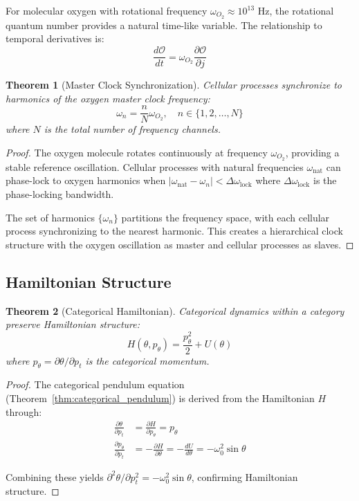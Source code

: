 \documentclass[11pt,twocolumn,a4paper]{article}
\newtheorem{theorem}{Theorem}[section]
\theoremstyle{definition}
\theoremstyle{remark}
\newcommand{\omegalock}{\Delta\omega_{\mathrm{lock}}}
\begin{document}
For molecular oxygen with rotational frequency $\omega_{O_2} \approx 10^{13}$ Hz, the rotational quantum number provides a natural time-like variable. The relationship to temporal derivatives is:
\begin{equation}
\frac{d\mathcal{O}}{dt} = \omega_{O_2} \frac{\partial \mathcal{O}}{\partial j}
\label{eq:gyrometric_temporal}
\end{equation}

\begin{theorem}[Master Clock Synchronization]
\label{thm:master_clock}
Cellular processes synchronize to harmonics of the oxygen master clock frequency:
\begin{equation}
\omega_n = \frac{n}{N} \omega_{O_2}, \quad n \in \{1,2,\ldots,N\}
\label{eq:master_clock_harmonics}
\end{equation}
where $N$ is the total number of frequency channels.
\end{theorem}

\begin{proof}
The oxygen molecule rotates continuously at frequency $\omega_{O_2}$, providing a stable reference oscillation. Cellular processes with natural frequencies $\omega_{\mathrm{nat}}$ can phase-lock to oxygen harmonics when $|\omega_{\mathrm{nat}} - \omega_n| < \omegalock$ where $\omegalock$ is the phase-locking bandwidth.

The set of harmonics $\{\omega_n\}$ partitions the frequency space, with each cellular process synchronizing to the nearest harmonic. This creates a hierarchical clock structure with the oxygen oscillation as master and cellular processes as slaves.
\end{proof}

\subsection{Hamiltonian Structure}

\begin{theorem}[Categorical Hamiltonian]
\label{thm:categorical_hamiltonian}
Categorical dynamics within a category preserve Hamiltonian structure:
\begin{equation}
H(\theta, p_\theta) = \frac{p_\theta^2}{2} + U(\theta)
\label{eq:categorical_hamiltonian}
\end{equation}
where $p_\theta = \partial\theta/\partial p_t$ is the categorical momentum.
\end{theorem}

\begin{proof}
The categorical pendulum equation (Theorem~\ref{thm:categorical_pendulum}) is derived from the Hamiltonian $H$ through:
\begin{align}
\frac{\partial\theta}{\partial p_t} &= \frac{\partial H}{\partial p_\theta} = p_\theta \label{eq:hamilton_1} \\
\frac{\partial p_\theta}{\partial p_t} &= -\frac{\partial H}{\partial \theta} = -\frac{dU}{d\theta} = -\omega_0^2 \sin\theta \label{eq:hamilton_2}
\end{align}

Combining these yields $\partial^2\theta/\partial p_t^2 = -\omega_0^2\sin\theta$, confirming Hamiltonian structure.
\end{proof}
\end{document}
